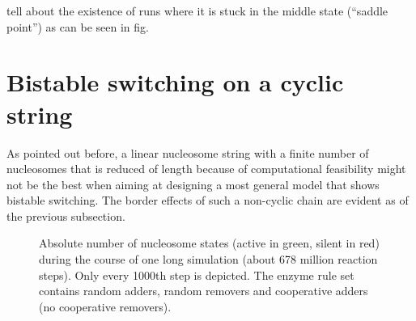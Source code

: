             \begin{itemize}
                {
                    \color{red}
                    \item tell about the existence of runs where it is stuck in the middle state (“saddle point”) as can be seen in fig.
                }
            \end{itemize}
    \newpage
    \section{Bistable switching on a cyclic string}
        \label{sec:ResBistableSwitching}

        As pointed out before, a linear nucleosome string with a finite number of nucleosomes that is reduced of length because of computational feasibility might not be the best when aiming at designing a most general model that shows bistable switching. The border effects of such a non-cyclic chain are evident as of the previous subsection.

        \begin{figure}[htpb!]
            \centering
            \caption{Absolute number of nucleosome states (active in green, silent in red) during the course of one long simulation (about 678 million reaction steps). Only every 1000th step is depicted. The enzyme rule set contains random adders, random removers and cooperative adders (no cooperative removers).}
            \label{img:cyclWCoopRem_runPlot1}
        \end{figure}

